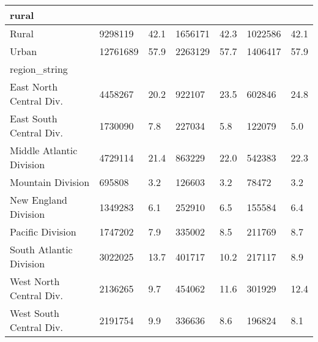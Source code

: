 \begin{longtable}{lllllll}
\midrule
\multicolumn{1}{l}{rural} \\ 
\midrule
Rural & 9298119 & 42.1 & 1656171 & 42.3 & 1022586 & 42.1 \\ 
Urban & 12761689 & 57.9 & 2263129 & 57.7 & 1406417 & 57.9 \\ 
\midrule
\multicolumn{1}{l}{region\_string} \\ 
\midrule
East North Central Div. & 4458267 & 20.2 & 922107 & 23.5 & 602846 & 24.8 \\ 
East South Central Div. & 1730090 & 7.8 & 227034 & 5.8 & 122079 & 5.0 \\ 
Middle Atlantic Division & 4729114 & 21.4 & 863229 & 22.0 & 542383 & 22.3 \\ 
Mountain Division & 695808 & 3.2 & 126603 & 3.2 & 78472 & 3.2 \\ 
New England Division & 1349283 & 6.1 & 252910 & 6.5 & 155584 & 6.4 \\ 
Pacific Division & 1747202 & 7.9 & 335002 & 8.5 & 211769 & 8.7 \\ 
South Atlantic Division & 3022025 & 13.7 & 401717 & 10.2 & 217117 & 8.9 \\ 
West North Central Div. & 2136265 & 9.7 & 454062 & 11.6 & 301929 & 12.4 \\ 
West South Central Div. & 2191754 & 9.9 & 336636 & 8.6 & 196824 & 8.1 \\ 
 \bottomrule
\end{longtable}

